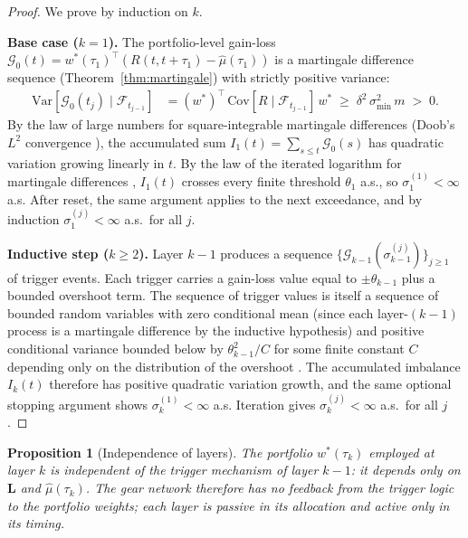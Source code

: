 \documentclass[twocolumn,11pt,a4paper]{article}
\theoremstyle{plain}
\newtheorem{proposition}[theorem]{Proposition}
\theoremstyle{definition}
\theoremstyle{remark}
\newcommand{\F}{\mathcal{F}}
\newcommand{\Lop}{\mathbf{L}}        %
\newcommand{\wstar}{w^{*}}
\newcommand{\Gain}{\mathcal{G}}
\begin{document}
\begin{proof}
  We prove by induction on $k$.

  \textbf{Base case ($k=1$).}  The portfolio-level gain-loss
  $\Gain_0(t)=\wstar(\tau_1)^{\top}(R(t,t+\tau_1)-\hat\mu(\tau_1))$
  is a martingale difference sequence (Theorem~\ref{thm:martingale})
  with strictly positive variance:
  \begin{align}
    \mathrm{Var}[\Gain_0(t_j)\mid\F_{t_{j-1}}]
    &= (\wstar)^{\top}\,\mathrm{Cov}[R\mid\F_{t_{j-1}}]\,\wstar
    \;\ge\; \delta^2\,\sigma_{\min}^2\,m \;>\; 0.
    \label{eq:var_lower}
  \end{align}
  By the law of large numbers for square-integrable martingale
  differences (Doob's $L^2$ convergence \cite{Doob1953}), the
  accumulated sum $I_1(t)=\sum_{s\le t}\Gain_0(s)$ has quadratic
  variation growing linearly in $t$.  By the law of the iterated
  logarithm for martingale differences \cite{Shiryaev1978}, $I_1(t)$
  crosses every finite threshold $\theta_1$ a.s., so $\sigma_1^{(1)}<\infty$
  a.s.  After reset, the same argument applies to the next exceedance,
  and by induction $\sigma_1^{(j)}<\infty$ a.s.~for all $j$.

  \textbf{Inductive step ($k\ge 2$).}  Layer $k-1$ produces a sequence
  $\{\Gain_{k-1}(\sigma_{k-1}^{(j)})\}_{j\ge 1}$ of trigger events.
  Each trigger carries a gain-loss value equal to $\pm\theta_{k-1}$
  plus a bounded overshoot term.  The sequence of trigger values is
  itself a sequence of bounded random variables with zero conditional
  mean (since each layer-$(k-1)$ process is a martingale difference by
  the inductive hypothesis) and positive conditional variance bounded
  below by $\theta_{k-1}^2 / C$ for some finite constant $C$ depending
  only on the distribution of the overshoot \cite{Shiryaev1978,KaratzasShreve1991}.
  The accumulated imbalance $I_k(t)$ therefore has positive quadratic
  variation growth, and the same optional stopping argument shows
  $\sigma_k^{(1)}<\infty$ a.s.  Iteration gives $\sigma_k^{(j)}<\infty$
  a.s.~for all $j$.
\end{proof}

\begin{proposition}[Independence of layers]
  \label{prop:layer_independence}
  The portfolio $\wstar(\tau_k)$ employed at layer $k$ is independent
  of the trigger mechanism of layer $k-1$: it depends only on $\Lop$
  and $\hat\mu(\tau_k)$.  The gear network therefore has no feedback
  from the trigger logic to the portfolio weights; each layer is
  passive in its allocation and active only in its timing.
\end{proposition}
\end{document}
